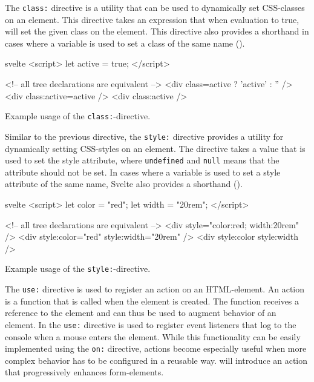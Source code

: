 The \texttt{class:} directive is a utility that can be used to dynamically set CSS-classes on an element. This directive takes an expression that when evaluation to true, will set the given class on the element. This directive also provides a shorthand in cases where a variable is used to set a class of the same name ().
\begin{listing}[H]
\begin{myminted}{svelte}{}
<script>
  let active = true;
</script>

<!-- all tree declarations are equivalent -->
<div class={active ? 'active' : ''} />
<div class:active={active} />
<div class:active />
\end{myminted}
\caption{Example usage of the \texttt{class:}-directive.}
\label{fig:svelte-class-directive}
\end{listing}

Similar to the previous directive, the \texttt{style:} directive provides a utility for dynamically setting CSS-styles on an element. The directive takes a value that is used to set the style attribute, where \texttt{undefined} and \texttt{null} means that the attribute should not be set. In cases where a variable is used to set a style attribute of the same name, Svelte also provides a shorthand ().

\begin{listing}[H]
\begin{myminted}{svelte}{}
<script>
  let color = "red";
  let width = "20rem";
</script>

<!-- all tree declarations are equivalent -->
<div style="color:red; width:20rem" />
<div style:color="red" style:width="20rem" />
<div style:color style:width />
\end{myminted}
\caption{Example usage of the \texttt{style:}-directive.}
\label{fig:svelte-style-directive}
\end{listing}

The \texttt{use:} directive is used to register an action on an HTML-element. An action is a function that is called when the element is created. The function receives a reference to the element and can thus be used to augment behavior of an element. In  the \texttt{use:} directive is used to register event listeners that log to the console when a mouse enters the element. While this functionality can be easily implemented using the \texttt{on:} directive, actions become especially useful when more complex behavior has to be configured in a reusable way.  will introduce an action that progressively enhances form-elements.

